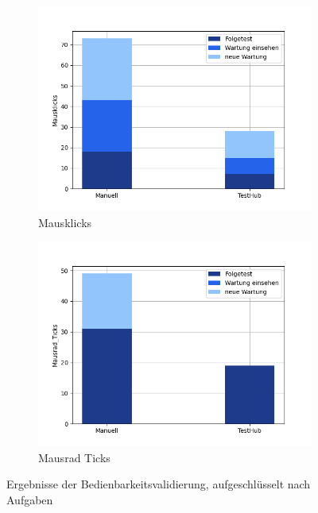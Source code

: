 \begin{figure}[H]
\begin{subfigure}{.5\textwidth}
        \includegraphics[width=\linewidth]{speedtests/validierung_Mausklicks.png}
        \caption{Mausklicks}
      \end{subfigure}%
      \begin{subfigure}{.5\textwidth}
        \centering
        \includegraphics[width=\linewidth]{speedtests/validierung_Mausrad_Ticks.png}
        \caption{Mausrad Ticks}
      \end{subfigure}
    \caption{Ergebnisse der Bedienbarkeitsvalidierung, aufgeschlüsselt nach Aufgaben}
   
\end{figure}

